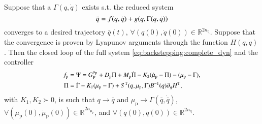 \begin{Theorem}
	Suppose that a $\Gamma(q,\dot{q})$ exists s.t. the reduced system
	\begin{equation}\small\label{eq:backstepping:reduced_sys}
		\ddot{q} = f(q,\dot{q}) + g(q,\Gamma(q,\dot{q}))
	\end{equation}
	converges to a desired trajectory $\bar{q}(t)$, $\forall (q(0),\dot{q}(0)) \in \mathbb{R}^{2 n_{\mathrm{q}}}$. Suppose that the convergence is proven by Lyapunov arguments through the function $H(q,\dot{q})$. Then the closed loop of the full system \eqref{eq:backstepping:complete_dyn} and the controller
	\begin{equation}\small\label{eq:backstepping:pi_psi}
		\begin{split}
			f_\mathrm{p} &= \Psi = G_{\mathrm{P}}^{\mu_\mathrm{p}} + D_\mathrm{p} \Pi + M_\mathrm{p} \dot{\Pi} - K_2 (\dot{\mu}_\mathrm{p} - \Pi) - (\mu_\mathrm{p} - \Gamma),\\
			\Pi &= \dot{\Gamma} - K_1 (\mu_\mathrm{p} - \Gamma) 
			+ S^{\mathrm{T}}(q,\mu_\mathrm{p},\Gamma)B^{-1}(q)\partial_{\dot{q}} H^{\mathrm{T}},
		\end{split}
	\end{equation}
	with $K_1,K_2 \succ 0$, is such that $q \rightarrow \bar{q}$ and $\mu_\mathrm{p} \rightarrow \Gamma(\bar q,\dot{\bar q})$, $\forall (\mu_\mathrm{p}(0),\dot{\mu}_\mathrm{p}(0)) \in \mathbb{R}^{2n_{\mu_\mathrm{p}}}$, and $\forall (q(0),\dot{q}(0)) \in \mathbb{R}^{2 n_{\mathrm{q}}}$.
\end{Theorem}
